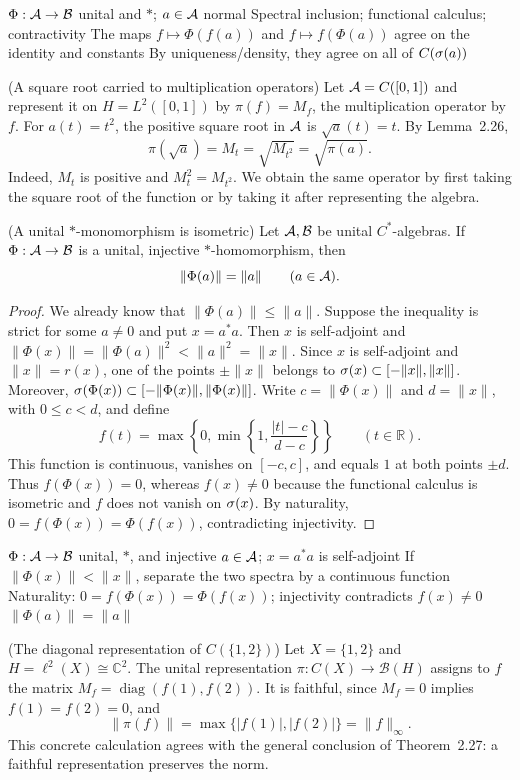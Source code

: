 \proofdiagram
{$\Phi:\mathcal A\to\mathcal B$ unital and $*$; $a\in\mathcal A$ normal}
{Spectral inclusion; functional calculus; contractivity}
{The maps $f\mapsto\Phi(f(a))$ and $f\mapsto f(\Phi(a))$ agree on the identity and constants}
{By uniqueness/density, they agree on all of $C(\sigma(a))$}

\begin{cthejemplo}{(A square root carried to multiplication operators)}
Let $\mathcal A=C([0,1])$ and represent it on $H=L^2([0,1])$ by
$\pi(f)=M_f$, the multiplication operator by $f$.
For $a(t)=t^2$, the positive square root in $\mathcal A$ is
$\sqrt a(t)=t$. By Lemma~2.26,
\[
 \pi(\sqrt a)=M_t=\sqrt{M_{t^2}}=\sqrt{\pi(a)}.
\]
Indeed, $M_t$ is positive and $M_t^2=M_{t^2}$.
We obtain the same operator by first taking the square root of the function
or by taking it after representing the algebra.
\end{cthejemplo}

\begin{cthteorema}{(A unital $*$-monomorphism is isometric)}
Let $\mathcal A,\mathcal B$ be unital $C^*$-algebras. If $\Phi:\mathcal A\to\mathcal B$ is a unital,
injective $*$-homomorphism, then
\[
 \|\Phi(a)\|=\|a\|\qquad(a\in\mathcal A).
\]
\end{cthteorema}

\begin{proof}[Proof]
We already know that $\|\Phi(a)\|\le\|a\|$. Suppose the inequality is strict
for some $a\neq0$ and put $x=a^*a$. Then $x$ is self-adjoint and
$\|\Phi(x)\|=\|\Phi(a)\|^2<\|a\|^2=\|x\|$.
Since $x$ is self-adjoint and $\|x\|=r(x)$, one of the points $\pm\|x\|$
belongs to $\sigma(x)\subset[-\|x\|,\|x\|]$.
Moreover, $\sigma(\Phi(x))\subset[-\|\Phi(x)\|,\|\Phi(x)\|]$.
Write $c=\|\Phi(x)\|$ and $d=\|x\|$, with $0\le c<d$, and define
\[
 f(t)=\max\!\left\{0,\min\!\left\{1,\frac{|t|-c}{d-c}\right\}\right\}
 \qquad(t\in\mathbb R).
\]
This function is continuous, vanishes on $[-c,c]$, and equals $1$ at both
points $\pm d$. Thus $f(\Phi(x))=0$, whereas $f(x)\neq0$ because the functional
calculus is isometric and $f$ does not vanish on $\sigma(x)$. By naturality,
$0=f(\Phi(x))=\Phi(f(x))$, contradicting injectivity.
\end{proof}

\proofdiagrambranch
{$\Phi:\mathcal A\to\mathcal B$ unital, $*$, and injective}
{$a\in\mathcal A$; $x=a^*a$ is self-adjoint}
{If $\|\Phi(x)\|<\|x\|$, separate the two spectra by a continuous function}
{Naturality: $0=f(\Phi(x))=\Phi(f(x))$; injectivity contradicts $f(x)\neq0$}
{$\|\Phi(a)\|=\|a\|$}

\begin{cthejemplo}{(The diagonal representation of $C(\{1,2\})$)}
Let $X=\{1,2\}$ and $H=\ell^2(X)\cong\mathbb C^2$.
The unital representation $\pi:C(X)\to\mathcal B(H)$ assigns to
$f$ the matrix $M_f=\operatorname{diag}(f(1),f(2))$.
It is faithful, since $M_f=0$ implies $f(1)=f(2)=0$, and
\[
 \|\pi(f)\|=\max\{|f(1)|,|f(2)|\}=\|f\|_\infty.
\]
This concrete calculation agrees with the general conclusion of
Theorem~2.27: a faithful representation preserves the norm.
\end{cthejemplo}

